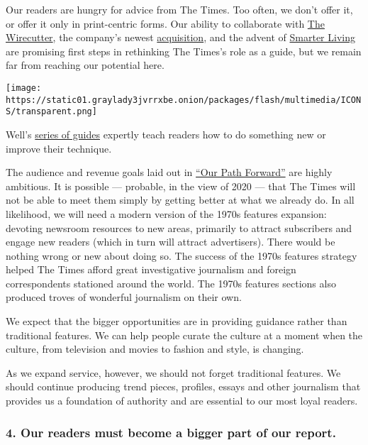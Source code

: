 Our readers are hungry for advice from The Times. Too often, we don't
offer it, or offer it only in print-centric forms. Our ability to
collaborate with \href{http://thewirecutter.com/}{The Wirecutter}, the
company's newest
\href{http://investors.nytco.com/press/press-releases/press-release-details/2016/The-New-York-Times-Company-Acquires-The-Wirecutter-and-The-Sweethome/default.aspx}{acquisition},
and the advent of
\href{https://www.nytimes3xbfgragh.onion/spotlight/times-tips}{Smarter
Living} are promising first steps in rethinking The Times's role as a
guide, but we remain far from reaching our potential here.

\texttt{[image: https://static01.graylady3jvrrxbe.onion/packages/flash/multimedia/ICONS/transparent.png]}

Well's
\href{https://www.nytimes3xbfgragh.onion/spotlight/well-guides}{series
of guides} expertly teach readers how to do something new or improve
their technique.

The audience and revenue goals laid out in
\href{http://www.nytco.com/wp-content/uploads/Our-Path-Forward.pdf}{``Our
Path Forward''} are highly ambitious. It is possible --- probable, in
the view of 2020 --- that The Times will not be able to meet them simply
by getting better at what we already do. In all likelihood, we will need
a modern version of the 1970s features expansion: devoting newsroom
resources to new areas, primarily to attract subscribers and engage new
readers (which in turn will attract advertisers). There would be nothing
wrong or new about doing so. The success of the 1970s features strategy
helped The Times afford great investigative journalism and foreign
correspondents stationed around the world. The 1970s features sections
also produced troves of wonderful journalism on their own.

We expect that the bigger opportunities are in providing guidance rather
than traditional features. We can help people curate the culture at a
moment when the culture, from television and movies to fashion and
style, is changing.

As we expand service, however, we should not forget traditional
features. We should continue producing trend pieces, profiles, essays
and other journalism that provides us a foundation of authority and are
essential to our most loyal readers.

\hypertarget{4-our-readers-must-become-a-bigger-part-of-our-report}{%
\subsubsection{4. Our readers must become a bigger part of our
report.}\label{4-our-readers-must-become-a-bigger-part-of-our-report}}

